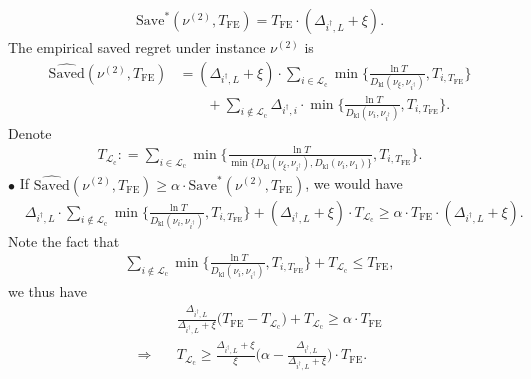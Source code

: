 \documentclass[twoside,11pt]{article}
\newcommand{\kl}{D_{\mathrm{kl}}}
\newcommand{\calL}{\mathcal{L}}
\newcommand{\rmc}{\mathrm{c}}
\newcommand{\Tfe}{T_{\mathrm{FE}}}
\newcommand{\Saved}{\mathrm{Save}}
\newcommand{\whatSaved}{\widehat{\mathrm{Saved}}}
\newcommand{\idagger}{{i^{\dagger}}}
\begin{document}
\begin{align}
    \Saved^*(\nu^{(2)},\Tfe) = \Tfe \cdot (\Delta_{\idagger,L}+\xi).
\end{align}
The empirical saved regret under instance $\nu^{(2)}$ is
\begin{align}
    \whatSaved(\nu^{(2)},\Tfe) &= 
    (\Delta_{\idagger,L}+\xi) \cdot \sum_{i\in\calL_{\rmc}} \min\bigg\{\frac{\ln T}{\kl(\nu_\xi,\nu_{\idagger})} ,T_{i,\Tfe}\bigg\}
    \\
    &\qquad+
     \sum_{i\notin\calL_{\rmc}}\Delta_{\idagger,i}\cdot \min\bigg\{\frac{\ln T}{\kl(\nu_i,\nu_{\idagger})}, T_{i,\Tfe}\bigg\}.
\end{align}
Denote
\begin{align}
    T_{\calL_{\rmc}}: = 
    \sum_{i\in\calL_{\rmc}} \min\bigg\{\frac{\ln T}{\min\{\kl(\nu_\xi,\nu_{\idagger}),\kl(\nu_i,\nu_1)\}}, T_{i,\Tfe}\bigg\}.
\end{align}
$\bullet$ If $\whatSaved(\nu^{(2)},\Tfe)\geq \alpha\cdot \Saved^*(\nu^{(2)},\Tfe)$, we would have
\begin{align}
    &
    \Delta_{\idagger,L}\cdot \sum_{i\notin\calL_{\rmc}} \min\bigg\{\frac{\ln T}{\kl(\nu_i,\nu_{\idagger})}, T_{i,\Tfe}\bigg\}
    +
    (\Delta_{\idagger,L}+\xi)\cdot T_{\calL_{\rmc}}
    \geq
    \alpha\cdot \Tfe \cdot(\Delta_{\idagger,L}+\xi).
\end{align}
Note the fact that
\begin{align}\label{equ:sumlesTfe}
    \sum_{i\notin\calL_{\rmc}} \min\bigg\{\frac{\ln T}{\kl(\nu_i,\nu_{\idagger})}, T_{i,\Tfe}\bigg\}
    +
    T_{\calL_{\rmc}}
    \leq
    \Tfe,
\end{align}
we thus have 
\begin{align}
    &\frac{\Delta_{\idagger,L} }{\Delta_{\idagger,L}+\xi}
    \Big(
        \Tfe - 
        T_{\calL_{\rmc}}
    \Big)
    +
    T_{\calL_{\rmc}}
    \geq
    \alpha\cdot \Tfe
    \\
    \Rightarrow\quad &
    T_{\calL_{\rmc}}
    \geq 
    \frac{\Delta_{\idagger,L}+\xi}{\xi} \Big(\alpha-  \frac{\Delta_{\idagger,L}}{\Delta_{\idagger,L}+\xi }\Big)\cdot \Tfe.
    \label{equ:contradiction_1}
\end{align}
\end{document}
